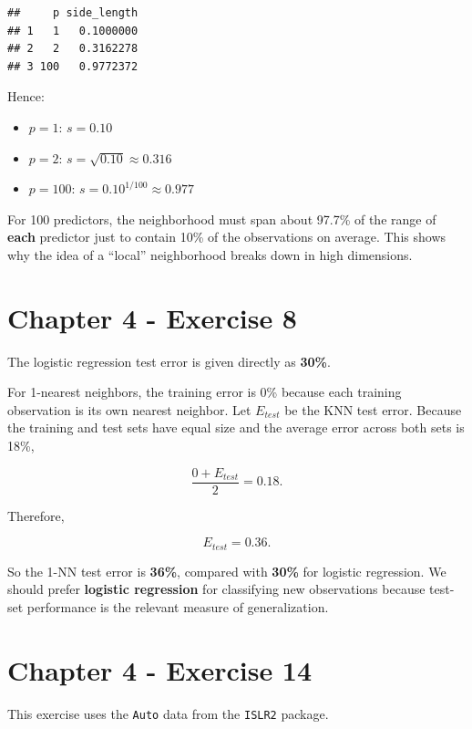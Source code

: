 \documentclass[
]{article}
\providecommand{\tightlist}{%
  \setlength{\itemsep}{0pt}\setlength{\parskip}{0pt}}
\begin{document}
\begin{verbatim}
##     p side_length
## 1   1   0.1000000
## 2   2   0.3162278
## 3 100   0.9772372
\end{verbatim}

Hence:

\begin{itemize}
\tightlist
\item
  \(p=1\): \(s=0.10\)
\item
  \(p=2\): \(s=\sqrt{0.10}\approx 0.316\)
\item
  \(p=100\): \(s=0.10^{1/100}\approx 0.977\)
\end{itemize}

For 100 predictors, the neighborhood must span about 97.7\% of the range
of \textbf{each} predictor just to contain 10\% of the observations on
average. This shows why the idea of a ``local'' neighborhood breaks down
in high dimensions.

\section{Chapter 4 - Exercise 8}\label{chapter-4---exercise-8}

The logistic regression test error is given directly as \textbf{30\%}.

For 1-nearest neighbors, the training error is 0\% because each training
observation is its own nearest neighbor. Let \(E_{test}\) be the KNN
test error. Because the training and test sets have equal size and the
average error across both sets is 18\%,

\[
\frac{0 + E_{test}}{2}=0.18.
\]

Therefore,

\[
E_{test}=0.36.
\]

So the 1-NN test error is \textbf{36\%}, compared with \textbf{30\%} for
logistic regression. We should prefer \textbf{logistic regression} for
classifying new observations because test-set performance is the
relevant measure of generalization.

\section{Chapter 4 - Exercise 14}\label{chapter-4---exercise-14}

This exercise uses the \texttt{Auto} data from the \texttt{ISLR2}
package.
\end{document}
